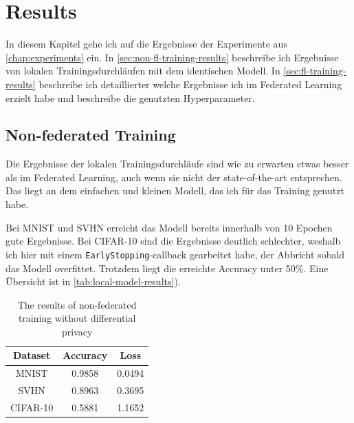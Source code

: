 \chapter{Results}\label{chap:results}

In diesem Kapitel gehe ich auf die Ergebnisse der Experimente aus \autoref{chap:experiments} ein. In \autoref{sec:non-fl-training-results} beschreibe ich Ergebnisse von lokalen Trainingsdurchläufen mit dem identischen Modell. In \autoref{sec:fl-training-results} beschreibe ich detaillierter welche Ergebnisse ich im Federated Learning erzielt habe und beschreibe die genutzten Hyperparameter.

\section{Non-federated Training} \label{sec:non-fl-training-results}
Die Ergebnisse der lokalen Trainingsdurchläufe sind wie zu erwarten etwas besser als im Federated Learning, auch wenn sie nicht der state-of-the-art entsprechen. Das liegt an dem einfachen und kleinen Modell, das ich für das Training genutzt habe.

Bei MNIST und SVHN erreicht das Modell bereits innerhalb von 10 Epochen gute Ergebnisse. Bei CIFAR-10 sind die Ergebnisse deutlich schlechter, weshalb ich hier mit einem \texttt{EarlyStopping}-callback gearbeitet habe, der Abbricht sobald das Modell overfittet. Trotzdem liegt die erreichte Accuracy unter 50\%. Eine Übersicht ist in \autoref{tab:local-model-results}).

\begin{table}
	\centering
	\begin{tabular}{|c|c|c|}
		\hline
		Dataset & Accuracy & Loss \\
		\hline
		MNIST & 0.9858 & 0.0494 \\
		SVHN & 0.8963 & 0.3695 \\
		CIFAR-10 & 0.5881 & 1.1652 \\
		\hline
	\end{tabular}
	\caption{The results of non-federated training without differential privacy}
	\label{tab:local-model-results}
\end{table}

